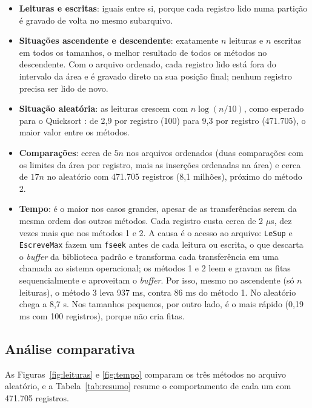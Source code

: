 \documentclass{article}
\begin{document}
\begin{itemize}
    \item \textbf{Leituras e escritas}: iguais entre si, porque cada registro lido numa partição é gravado de volta no mesmo subarquivo.
    \item \textbf{Situações ascendente e descendente}: exatamente $n$ leituras e $n$ escritas em todos os tamanhos, o melhor resultado de todos os métodos no descendente. Com o arquivo ordenado, cada registro lido está fora do intervalo da área e é gravado direto na sua posição final; nenhum registro precisa ser lido de novo.
    \item \textbf{Situação aleatória}: as leituras crescem com $n \log (n/10)$, como esperado para o Quicksort \cite{cormen2009}: de 2,9 por registro (100) para 9,3 por registro (471.705), o maior valor entre os métodos.
    \item \textbf{Comparações}: cerca de $5n$ nos arquivos ordenados (duas comparações com os limites da área por registro, mais as inserções ordenadas na área) e cerca de $17n$ no aleatório com 471.705 registros (8,1 milhões), próximo do método 2.
    \item \textbf{Tempo}: é o maior nos casos grandes, apesar de as transferências serem da mesma ordem dos outros métodos. Cada registro custa cerca de 2 $\mu$s, dez vezes mais que nos métodos 1 e 2. A causa é o acesso ao arquivo: \texttt{LeSup} e \texttt{EscreveMax} fazem um \texttt{fseek} antes de cada leitura ou escrita, o que descarta o \emph{buffer} da biblioteca padrão e transforma cada transferência em uma chamada ao sistema operacional; os métodos 1 e 2 leem e gravam as fitas sequencialmente e aproveitam o \emph{buffer}. Por isso, mesmo no ascendente (só $n$ leituras), o método 3 leva 937 ms, contra 86 ms do método 1. No aleatório chega a 8,7 s. Nos tamanhos pequenos, por outro lado, é o mais rápido (0,19 ms com 100 registros), porque não cria fitas.
\end{itemize}

\clearpage
\subsection{Análise comparativa}

As Figuras~\ref{fig:leituras} e \ref{fig:tempo} comparam os três métodos no arquivo aleatório, e a Tabela~\ref{tab:resumo} resume o comportamento de cada um com 471.705 registros.
\end{document}
